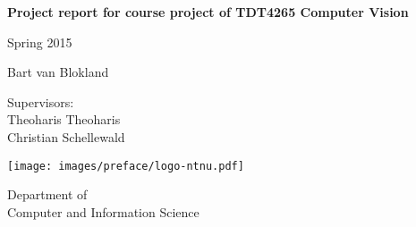 \documentclass[12pt,a4paper,oneside]{report}
\begin{document}

\thispagestyle{empty}

\begin{center}
    {\Huge\textbf{Project report for course project of TDT4265 Computer Vision}} \\
    \medskip

    \vspace{2cm}

    \vspace{.7cm}

    {\large Spring 2015}\\

    \vspace{.7cm}

    {\large
    Bart van Blokland\\
    }

    \vspace{.7cm}

    {\large
    Supervisors:\\
    Theoharis Theoharis\\
    Christian Schellewald\\}

    \vspace{10cm}

    \texttt{[image: images/preface/logo-ntnu.pdf]}

    \large{Department of\\Computer and Information Science}

\end{center}

\newpage

\setcounter{tocdepth}{1}
\tableofcontents
\clearpage






\appendix




\end{document}
